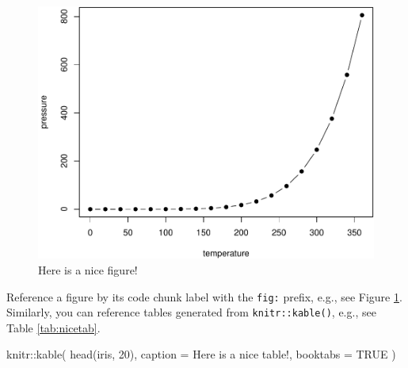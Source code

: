 \documentclass[
  fontsize=13pt,
  english,
  a4paper,
  openany, a4paper, oneside]{book}
\newenvironment{Shaded}{\begin{snugshade}}{\end{snugshade}}
\newcommand{\AttributeTok}[1]{\textcolor[rgb]{0.77,0.63,0.00}{#1}}
\newcommand{\ConstantTok}[1]{\textcolor[rgb]{0.00,0.00,0.00}{#1}}
\newcommand{\DecValTok}[1]{\textcolor[rgb]{0.00,0.00,0.81}{#1}}
\newcommand{\FunctionTok}[1]{\textcolor[rgb]{0.00,0.00,0.00}{#1}}
\newcommand{\NormalTok}[1]{#1}
\newcommand{\SpecialCharTok}[1]{\textcolor[rgb]{0.00,0.00,0.00}{#1}}
\newcommand{\StringTok}[1]{\textcolor[rgb]{0.31,0.60,0.02}{#1}}
\begin{document}
\begin{figure}

{\centering \includegraphics[width=0.8\linewidth]{reprex_collaboration_guide_files/figure-latex/nice-fig-1} 

}

\caption{Here is a nice figure!}\label{fig:nice-fig}
\end{figure}

Reference a figure by its code chunk label with the \texttt{fig:} prefix, e.g., see Figure \ref{fig:nice-fig}. Similarly, you can reference tables generated from \texttt{knitr::kable()}, e.g., see Table \ref{tab:nicetab}.

\begin{Shaded}
\begin{Highlighting}[]
\NormalTok{knitr}\SpecialCharTok{::}\FunctionTok{kable}\NormalTok{(}
  \FunctionTok{head}\NormalTok{(iris, }\DecValTok{20}\NormalTok{), }\AttributeTok{caption =} \StringTok{\textquotesingle{}Here is a nice table!\textquotesingle{}}\NormalTok{,}
  \AttributeTok{booktabs =} \ConstantTok{TRUE}
\NormalTok{)}
\end{Highlighting}
\end{Shaded}
\end{document}
